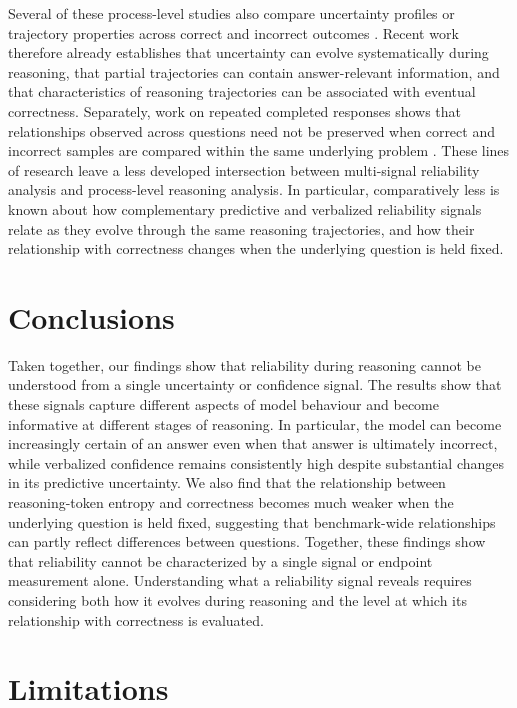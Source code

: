 \documentclass{article}
\begin{document}
Several of these process-level studies also compare uncertainty profiles or trajectory properties across correct and incorrect outcomes \citep{zhu2026edis,zhao2026entropytrajectory,grunefeld2026tracing,zhou2025landscape}. Recent work therefore already establishes that uncertainty can evolve systematically during reasoning, that partial trajectories can contain answer-relevant information, and that characteristics of reasoning trajectories can be associated with eventual correctness. Separately, work on repeated completed responses shows that relationships observed across questions need not be preserved when correct and incorrect samples are compared within the same underlying problem \citep{taubenfeld2025confidence}. These lines of research leave a less developed intersection between multi-signal reliability analysis and process-level reasoning analysis. In particular, comparatively less is known about how complementary predictive and verbalized reliability signals relate as they evolve through the same reasoning trajectories, and how their relationship with correctness changes when the underlying question is held fixed.




\section{Conclusions}
\label{sec:conclusions}

Taken together, our findings show that reliability during reasoning cannot be understood from a single uncertainty or confidence signal. The results show that these signals capture different aspects of model behaviour and become informative at different stages of reasoning. In particular, the model can become increasingly certain of an answer even when that answer is ultimately incorrect, while verbalized confidence remains consistently high despite substantial changes in its predictive uncertainty. We also find that the relationship between reasoning-token entropy and correctness becomes much weaker when the underlying question is held fixed, suggesting that benchmark-wide relationships can partly reflect differences between questions. Together, these findings show that reliability cannot be characterized by a single signal or endpoint measurement alone. Understanding what a reliability signal reveals requires considering both how it evolves during reasoning and the level at which its relationship with correctness is evaluated.


\section{Limitations}
\label{sec:limitations}
\end{document}
